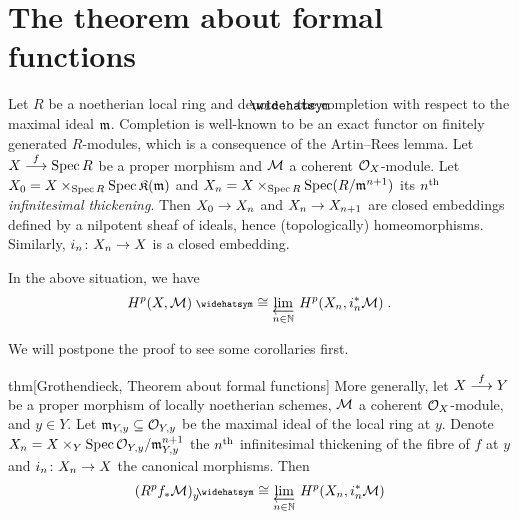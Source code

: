 \documentclass[a4paper,parskip=half,numbers=enddot, DIV=12]{scrreprt}
\begin{document}
\section{The theorem about formal functions}
Let $R$ be a noetherian local ring and denote $\roof{\phantom{x}}$ the completion with respect to the maximal ideal $\mathfrak{m}$. Completion is well-known to be an exact functor on finitely generated $R$-modules, which is a consequence of the Artin--Rees lemma. Let $X\morphism[f]\Spec R$ be a proper morphism and $\mathcal{M}$ a coherent $\mathcal{O}_X$-module. Let $X_0=X\times_{\operatorname{Spec} R}\operatorname{Spec} \mathfrak{K}(\mathfrak{m})$ and $X_n=X\times_{\operatorname{Spec} R}\operatorname{Spec} (R/\mathfrak{m}^{n+1})$ its \emph{$n^{\text{th}}$ infinitesimal thickening}. Then $X_0\morphism X_n$ and $X_n\morphism X_{n+1}$ are closed embeddings defined by a nilpotent sheaf of ideals, hence (topologically) homeomorphisms. Similarly, $i_n\colon X_n\morphism X$ is a closed embedding.
\begin{thm}
	In the above situation, we have
	\begin{align*}
		H^p(X,\Mm)^\complete \cong\limit[n\in\IN]H^p(X_n,i_n^*\Mm)\;.
	\end{align*}
\end{thm}
We will postpone the proof to see some corollaries first.
\begin{varthm}{thm}[Grothendieck, Theorem about formal functions]
	More generally, let $X\morphism[f]Y$ be a proper morphism of locally noetherian schemes, $\mathcal{M}$ a coherent $\mathcal{O}_X$-module, and $y\in Y$. Let $\mathfrak{m}_{Y,y}\subseteq \mathcal{O}_{Y,y}$ be the maximal ideal of the local ring at $y$. Denote $X_n=X\times_Y\operatorname{Spec} \mathcal{O}_{Y,y}/\mathfrak{m}_{Y,y}^{n+1}$ the $n^{\text{th}}$ infinitesimal thickening of the fibre of $f$ at $y$ and $i_n\colon X_n\morphism X$ the canonical morphisms. Then
	\begin{align*}
		(R^pf_*\Mm)_y^\complete\cong \limit[n\in \IN]H^p(X_n,i_n^*\Mm)
	\end{align*}
\end{varthm}
\end{document}
